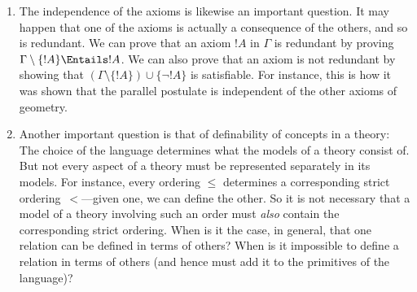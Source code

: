 \begin{explain}
\begin{enumerate}
  logical methods to investigate them, and we can also use logical
  methods to construct models.
\item The independence of the axioms is likewise an important
  question.  It may happen that one of the axioms is actually a
  consequence of the others, and so is redundant.  We can prove that
  an axiom $!A$ in $\Gamma$ is redundant by proving $\Gamma \setminus
  \{!A\} \Entails !A$.  We can also prove that an axiom is not
  redundant by showing that $(\Gamma \setminus \{!A\}) \cup \{\lnot
  !A\}$ is satisfiable.  For instance, this is how it was shown that the
  parallel postulate is independent of the other axioms of geometry.
\item Another important question is that of definability of concepts
  in a theory: The choice of the language determines what the models
  of a theory consist of.  But not every aspect of a theory must be
  represented separately in its models.  For instance, every ordering
  $\le$ determines a corresponding strict ordering~$<$---given one, we
  can define the other.  So it is not necessary that a model of a
  theory involving such an order must \emph{also} contain the
  corresponding strict ordering.  When is it the case, in general,
  that one relation can be defined in terms of others?  When is it
  impossible to define a relation in terms of others (and hence must
  add it to the primitives of the language)?
\end{enumerate}
\end{explain}








